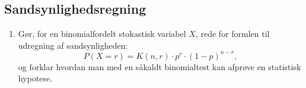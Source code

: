 \documentclass[10pt,a4paper]{article}
\begin{document}
\subsection*{Sandsynlighedsregning}
\begin{enumerate}[resume]
\item Gør, for en binomialfordelt stokastisk variabel $X$, rede for formlen til udregning af sandsynligheden:
$$P(X=r)=K(n,r)\cdot p^r\cdot (1-p)^{n-r},$$
og forklar hvordan man med en såkaldt binomialtest kan afprøve en statistisk hypotese.
\end{enumerate}
\end{document}
